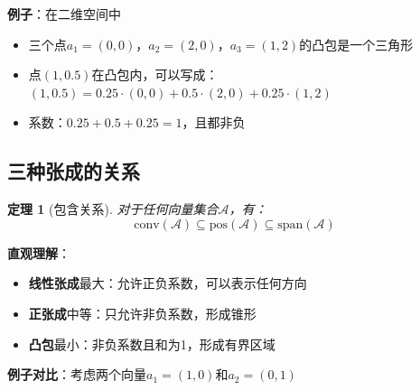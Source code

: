 \documentclass[12pt,a4paper]{article}
\newtheorem{theorem}{定理}
\begin{document}
\textbf{例子}：在二维空间中
\begin{itemize}
\item 三个点$a_1 = (0, 0)$，$a_2 = (2, 0)$，$a_3 = (1, 2)$的凸包是一个三角形
\item 点$(1, 0.5)$在凸包内，可以写成：$(1, 0.5) = 0.25 \cdot (0, 0) + 0.5 \cdot (2, 0) + 0.25 \cdot (1, 2)$
\item 系数：$0.25 + 0.5 + 0.25 = 1$，且都非负
\end{itemize}

\begin{center}
\end{center}

\subsection{三种张成的关系}

\begin{theorem}[包含关系]
对于任何向量集合$\mathcal{A}$，有：
\begin{equation}
\text{conv}(\mathcal{A}) \subseteq \text{pos}(\mathcal{A}) \subseteq \text{span}(\mathcal{A})
\label{eq:containment}
\end{equation}
\end{theorem}

\textbf{直观理解}：
\begin{itemize}
\item \textbf{线性张成}最大：允许正负系数，可以表示任何方向
\item \textbf{正张成}中等：只允许非负系数，形成锥形
\item \textbf{凸包}最小：非负系数且和为1，形成有界区域
\end{itemize}

\textbf{例子对比}：考虑两个向量$a_1 = (1, 0)$和$a_2 = (0, 1)$
\end{document}
